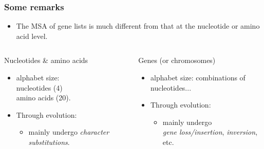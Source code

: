 \documentclass[xcolor=dvipsnames,envcountsect,handout]{beamer}
\begin{document}
\begin{frame}
\frametitle{Some remarks}
\begin{itemize}
\item The MSA of gene lists is much different from that at the
nucleotide or amino acid level. 
\end{itemize}
\vspace{6pt}
\begin{columns}
\begin{column}[t]{5cm}
Nucleotides \& amino acids
\begin{itemize}
\item alphabet size: \\nucleotides (4) \\
amino acids (20). 
\vspace{6pt}
\item Through evolution:
\begin{itemize}
\item mainly undergo {\em character substitutions}.
\end{itemize}
\end{itemize}
\end{column}
\begin{column}[t]{5cm}
Genes (or chromosomes)
\begin{itemize}
\item alphabet size: combinations of nucleotides...
\vspace{6pt}
\item Through evolution: 
\begin{itemize}
\item mainly undergo \\{\em gene loss/insertion}, 
{\em inversion}, etc. 
\end{itemize}
\end{itemize}
\end{column}
\end{columns}
\end{frame}
\end{document}
